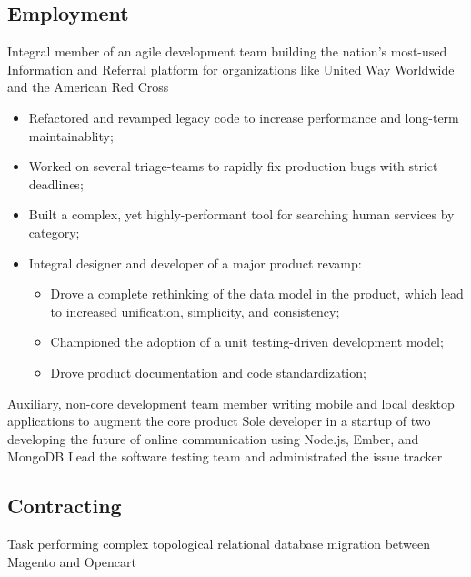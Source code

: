 \documentclass[10pt,a4paper,sans]{moderncv}        %
\begin{document}
\subsection{Employment}
    {Integral member of an agile development team building the nation's most-used Information
    and Referral platform for organizations like United Way Worldwide and the American Red
    Cross\newline{}
\begin{itemize}
\item Refactored and revamped legacy code to increase performance and long-term
    maintainablity;
\item Worked on several triage-teams to rapidly fix production bugs with strict deadlines;
\item Built a complex, yet highly-performant tool for searching human services by category;
\item Integral designer and developer of a major product revamp:
  \begin{itemize}
  \item Drove a complete rethinking of the data model in the product, which lead to increased
        unification, simplicity, and consistency;
  \item Championed the adoption of a unit testing-driven development model;
  \item Drove product documentation and code standardization;
  \end{itemize}
\end{itemize}}
    {Auxiliary, non-core development team member writing mobile and local desktop
    applications to augment the core product\newline{}}
    {Sole developer in a startup of two developing the future of online communication using
    Node.js, Ember, and MongoDB}
    {Lead the software testing team and administrated the issue tracker}
\subsection{Contracting}
    {Task performing complex topological relational database migration between Magento and
    Opencart}
%
%
\end{document}
